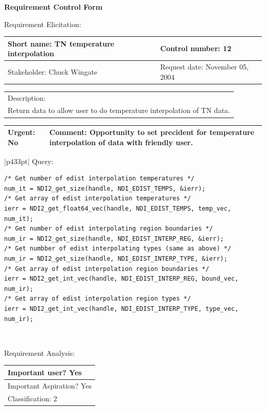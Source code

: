 \begin{center}\Large\bf
Requirement Control Form
\end{center}
\vspace{24pt}

Requirement Elicitation:

\begin{tabular}{|p{211pt}|p{211pt}|} \hline
Short name: TN temperature interpolation & Control number: 12\\ \hline
Stakeholder: Chuck Wingate & Request date: November 05, 2004\\
\end{tabular}
\begin{tabular}{|p{433pt}|} \hline
Description: \\ 
Return data to allow user to do temperature interpolation of TN data. \\
\hline
\end{tabular} 
\begin{tabular}{|p{211pt}|p{211pt}|} \hline
Urgent: No & Comment: Opportunity to set precident for temperature
interpolation of data with friendly user.\\ \hline
\end{tabular}

\vspace{12pt}

\begin{tabular}{|p{433pt}|} \hline
Query: 
\begin{verbatim}
/* Get number of edist interpolation temperatures */
num_it = NDI2_get_size(handle, NDI_EDIST_TEMPS, &ierr);
/* Get array of edist interpolation temperatures */
ierr = NDI2_get_float64_vec(handle, NDI_EDIST_TEMPS, temp_vec, num_it);
/* Get number of edist interpolating region boundaries */
num_ir = NDI2_get_size(handle, NDI_EDIST_INTERP_REG, &ierr);
/* Get numbber of edist interpolating types (same as above) */
num_ir = NDI2_get_size(handle, NDI_EDIST_INTERP_TYPE, &ierr);
/* Get array of edist interpolation region boundaries */
ierr = NDI2_get_int_vec(handle, NDI_EDIST_INTERP_REG, bound_vec, num_ir);
/* Get array of edist interpolation region types */
ierr = NDI2_get_int_vec(handle, NDI_EDIST_INTERP_TYPE, type_vec, num_ir);
\end{verbatim}
\\ \hline
\end{tabular}
\vspace{24pt}

Requirement Analysis:

\begin{tabular}{|p{433pt}|} \hline
Important user? Yes \\ \hline
Important Aspiration? Yes \\ \hline
Classification: 2 \\ \hline
\end{tabular}
\vspace{24pt}

